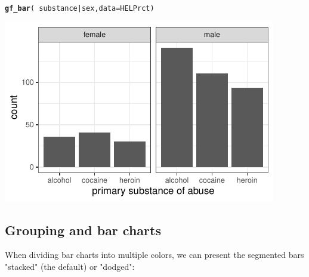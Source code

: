 \documentclass[twoside]{book}\usepackage[]{graphicx}\usepackage[]{xcolor}
\makeatletter
\def\maxwidth{ %
  \ifdim\Gin@nat@width>\linewidth
    \linewidth
  \else
    \Gin@nat@width
  \fi
}
\newcommand{\hlopt}[1]{\textcolor[rgb]{0,0,0}{#1}}%
\newcommand{\hlstd}[1]{\textcolor[rgb]{0.345,0.345,0.345}{#1}}%
\newcommand{\hlkwc}[1]{\textcolor[rgb]{0.333,0.667,0.333}{#1}}%
\newcommand{\hlkwd}[1]{\textcolor[rgb]{0.737,0.353,0.396}{\textbf{#1}}}%
\newenvironment{kframe}{%
 \def\at@end@of@kframe{}%
 \ifinner\ifhmode%
  \def\at@end@of@kframe{\end{minipage}}%
  \begin{minipage}{\columnwidth}%
 \fi\fi%
 \def\FrameCommand##1{\hskip\@totalleftmargin \hskip-\fboxsep
 \colorbox{shadecolor}{##1}\hskip-\fboxsep
     \hskip-\linewidth \hskip-\@totalleftmargin \hskip\columnwidth}%
 \MakeFramed {\advance\hsize-\width
   \@totalleftmargin\z@ \linewidth\hsize
   \@setminipage}}%
 {\par\unskip\endMakeFramed%
 \at@end@of@kframe}
\newenvironment{knitrout}{}{} %
\makeatother
\begin{document}
\begin{knitrout}
\color{fgcolor}\begin{kframe}
\begin{alltt}
\hlkwd{gf_bar}\hlstd{(} \hlopt{~} \hlstd{substance} \hlopt{|} \hlstd{sex,} \hlkwc{data} \hlstd{= HELPrct)}
\end{alltt}
\end{kframe}

{\centering \includegraphics[width=\maxwidth]{figures/fig-substance-by-sex-1} 

}



\end{knitrout}

\subsection{Grouping and bar charts}

When dividing bar charts into multiple colors, we can present the segmented bars "stacked" (the default)
or "dodged":
\end{document}
